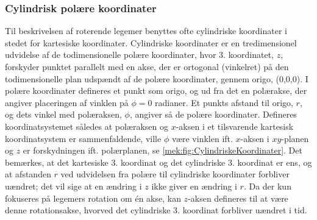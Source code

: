 \subsubsection{Cylindrisk polære koordinater}
Til beskrivelsen af roterende legemer benyttes ofte cylindriske koordinater i stedet for kartesiske koordinater. Cylindriske koordinater er en tredimensionel udvidelse af de todimensionelle polære koordinater, hvor 3. koordinatet, $z$, forskyder punktet parallelt med en akse, der er ortogonal (vinkelret) på den todimensionelle plan udspændt af de polære koordinater, gennem origo, (0,0,0). I polære koordinater defineres et punkt  som origo, og ud fra det en polærakse, der angiver placeringen af vinklen på $\phi = 0$ radianer. Et punkts afstand til origo, $r$, og dets vinkel med polæraksen, $\phi$, angiver så de polære koordinater. Defineres koordinatsystemet således at polæraksen og $x$-aksen i et tilsvarende kartesisk koordinatsystem er sammenfaldende, ville $\phi$ være vinklen ift. $x$-aksen i $xy$-planen og $z$ er forskydningen ift. polærplanen, se \cref{mek:fig:CylindriskeKoordinater}. Det bemærkes, at det kartesiske 3. koordinat og det cylindriske 3. koordinat er ens, og at afstanden $r$ ved udvidelsen fra polære til cylindriske koordinater forbliver uændret; det vil sige at en ændring i $z$ ikke giver en ændring i $r$. Da der kun fokuseres på legemers rotation om én akse, kan $z$-aksen defineres til at være denne rotationsakse, hvorved det cylindriske 3. koordinat forbliver uændret i tid.  \\

